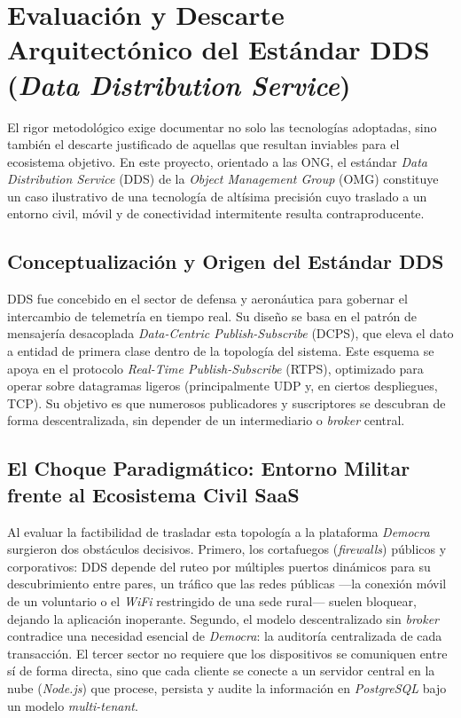 \section{Evaluación y Descarte Arquitectónico del Estándar DDS (\textit{Data Distribution Service})}

El rigor metodológico exige documentar no solo las tecnologías adoptadas, sino
también el descarte justificado de aquellas que resultan inviables para el
ecosistema objetivo. En este proyecto, orientado a las ONG, el estándar
\textit{Data Distribution Service} (DDS) de la \textit{Object Management Group}
(OMG) constituye un caso ilustrativo de una tecnología de altísima precisión cuyo
traslado a un entorno civil, móvil y de conectividad intermitente resulta
contraproducente.

\subsection{Conceptualización y Origen del Estándar DDS}

DDS fue concebido en el sector de defensa y aeronáutica para gobernar el intercambio
de telemetría en tiempo real. Su diseño se basa en el patrón de mensajería
desacoplada \textit{Data-Centric Publish-Subscribe} (DCPS), que eleva el dato a
entidad de primera clase dentro de la topología del sistema. Este esquema se apoya
en el protocolo \textit{Real-Time Publish-Subscribe} (RTPS), optimizado para operar
sobre datagramas ligeros (principalmente UDP y, en ciertos despliegues, TCP). Su
objetivo es que numerosos publicadores y suscriptores se descubran de forma
descentralizada, sin depender de un intermediario o \textit{broker} central.

\subsection{El Choque Paradigmático: Entorno Militar frente al Ecosistema Civil SaaS}

Al evaluar la factibilidad de trasladar esta topología a la plataforma
\textit{Democra} surgieron dos obstáculos decisivos. Primero, los cortafuegos
(\textit{firewalls}) públicos y corporativos: DDS depende del ruteo por múltiples
puertos dinámicos para su descubrimiento entre pares, un tráfico que las redes
públicas ---la conexión móvil de un voluntario o el \textit{WiFi} restringido de una
sede rural--- suelen bloquear, dejando la aplicación inoperante. Segundo, el modelo
descentralizado sin \textit{broker} contradice una necesidad esencial de
\textit{Democra}: la auditoría centralizada de cada transacción. El tercer sector no
requiere que los dispositivos se comuniquen entre sí de forma directa, sino que cada
cliente se conecte a un servidor central en la nube (\textit{Node.js}) que procese,
persista y audite la información en \textit{PostgreSQL} bajo un modelo
\textit{multi-tenant}.

